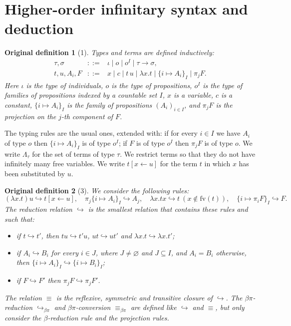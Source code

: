 \documentclass[10pt,a4paper]{article}
\newtheorem*{authordef}{Original definition}
\begin{document}
\section*{Higher-order infinitary syntax and deduction}
\begin{authordef}[1]
Types and terms are defined inductively:
\[\begin{array}{rcl}\tau,\sigma&::=&\iota\mid o\mid o^I\mid\tau\to\sigma,\\t,u,A_i,F&::=&x\mid c\mid t\,u\mid\lambda x.t\mid\{i\mapsto A_i\}_I\mid\pi_jF.\end{array}\]
Here $\iota$ is the type of individuals, $o$ is the type of propositions, $o^I$ is the type of families of propositions indexed by a countable set $I$, $x$ is a variable, $c$ is a constant, $\{i\mapsto A_i\}_I$ is the family of propositions $(A_i)_{i\in I}$, and $\pi_jF$ is the projection on the $j$-th component of $F$.
\end{authordef}
The typing rules are the usual ones, extended with: if for every $i\in I$ we have $A_i$ of type $o$ then $\{i\mapsto A_i\}_I$ is of type $o^I$; if $F$ is of type $o^I$ then $\pi_jF$ is of type $o$. We write $\Lambda_\tau$ for the set of terms of type $\tau$. We restrict terms so that they do not have infinitely many free variables. We write $t[x\leftarrow u]$ for the term $t$ in which $x$ has been substituted by $u$.
\begin{authordef}[3]
We consider the following rules:
\[(\lambda x.t)u\hookrightarrow t[x\leftarrow u],\quad\pi_j\{i\mapsto A_i\}_I\hookrightarrow A_j,\quad\lambda x.tx\hookrightarrow t\ (x\notin\mathrm{fv}(t)),\quad\{i\mapsto\pi_iF\}_I\hookrightarrow F.\]
The reduction relation $\hookrightarrow$ is the smallest relation that contains these rules and such that:
\begin{itemize}\item if $t\hookrightarrow t'$, then $tu\hookrightarrow t'u$, $ut\hookrightarrow ut'$ and $\lambda x.t\hookrightarrow\lambda x.t'$;
\item if $A_i\hookrightarrow B_i$ for every $i\in J$, where $J\ne\varnothing$ and $J\subseteq I$, and $A_i=B_i$ otherwise, then $\{i\mapsto A_i\}_I\hookrightarrow\{i\mapsto B_i\}_I$;
\item if $F\hookrightarrow F'$ then $\pi_jF\hookrightarrow\pi_jF'$.
\end{itemize}
The relation $\equiv$ is the reflexive, symmetric and transitive closure of $\hookrightarrow$. The $\beta\pi$-reduction $\hookrightarrow_{\beta\pi}$ and $\beta\pi$-conversion $\equiv_{\beta\pi}$ are defined like $\hookrightarrow$ and $\equiv$, but only consider the $\beta$-reduction rule and the projection rules.
\end{authordef}
\end{document}
